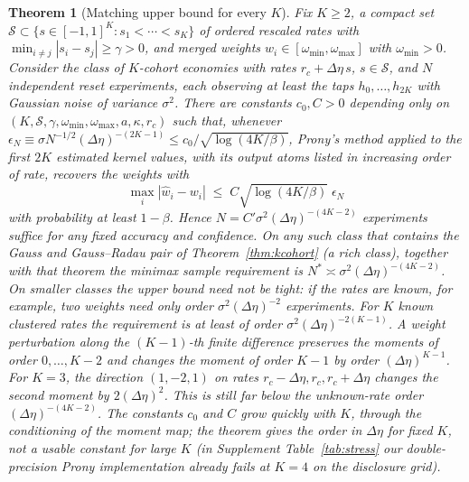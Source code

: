 \documentclass[12pt]{article}
\newtheorem{theorem}{Theorem}[section]
\theoremstyle{definition}
\theoremstyle{remark}
\begin{document}
\begin{theorem}[Matching upper bound for every $K$]\label{prop:esprit}
Fix $K\ge2$, a compact set $\mathcal S\subset\{s\in[-1,1]^K:s_1<\cdots<s_K\}$ of ordered rescaled rates with $\min_{i\ne j}|s_i-s_j|\ge\gamma>0$, and merged weights $w_i\in[\omega_{\min},\omega_{\max}]$ with $\omega_{\min}>0$. Consider the class of $K$-cohort economies with rates $r_c+\Delta\eta\,s$, $s\in\mathcal S$, and $N$ independent reset experiments, each observing at least the taps $h_0,\ldots,h_{2K}$ with Gaussian noise of variance $\sigma^2$. There are constants $c_0,C>0$ depending only on $(K,\mathcal S,\gamma,\omega_{\min},\omega_{\max},a,\kappa,r_c)$ such that, whenever $\epsilon_N\equiv\sigma N^{-1/2}(\Delta\eta)^{-(2K-1)}\le c_0/\sqrt{\log(4K/\beta)}$, Prony's method applied to the first $2K$ estimated kernel values, with its output atoms listed in increasing order of rate, recovers the weights with
\[
\max_i|\hat w_i-w_i|\;\le\;C\sqrt{\log(4K/\beta)}\;\epsilon_N
\]
with probability at least $1-\beta$. Hence $N=C'\sigma^2(\Delta\eta)^{-(4K-2)}$ experiments suffice for any fixed accuracy and confidence. On any such class that contains the Gauss and Gauss--Radau pair of Theorem~\ref{thm:kcohort} (a rich class), together with that theorem the minimax sample requirement is $N^*\asymp\sigma^2(\Delta\eta)^{-(4K-2)}$. On smaller classes the upper bound need not be tight: if the rates are known, for example, two weights need only order $\sigma^2(\Delta\eta)^{-2}$ experiments. For $K$ known clustered rates the requirement is at least of order $\sigma^2(\Delta\eta)^{-2(K-1)}$. A weight perturbation along the $(K-1)$-th finite difference preserves the moments of order $0,\ldots,K-2$ and changes the moment of order $K-1$ by order $(\Delta\eta)^{K-1}$. For $K=3$, the direction $(1,-2,1)$ on rates $r_c-\Delta\eta,r_c,r_c+\Delta\eta$ changes the second moment by $2(\Delta\eta)^2$. This is still far below the unknown-rate order $(\Delta\eta)^{-(4K-2)}$. The constants $c_0$ and $C$ grow quickly with $K$, through the conditioning of the moment map; the theorem gives the order in $\Delta\eta$ for fixed $K$, not a usable constant for large $K$ (in Supplement Table~\ref{tab:stress} our double-precision Prony implementation already fails at $K=4$ on the disclosure grid).
\end{theorem}
\end{document}

